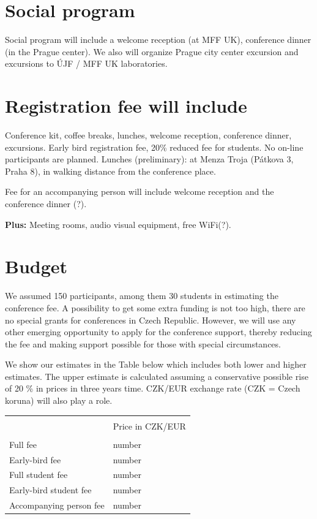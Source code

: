 \documentclass[12pt]{extarticle}
\begin{document}
\section*{Social program}
\noindent
Social program will include a welcome reception (at MFF UK), conference dinner (in the Prague center). 
We also will organize Prague city center excursion and excursions to ÚJF / MFF UK laboratories.

\section*{Registration fee will include}
\noindent
Conference kit, coffee breaks, lunches, welcome reception, conference dinner, excursions. Early bird registration fee, 20\%
reduced fee for students. No on-line participants are planned.
Lunches (preliminary): at Menza Troja (Pátkova 3, Praha 8), in walking distance from the conference place.

Fee for an accompanying person will include welcome reception and the conference dinner (?).

{\bf Plus:} Meeting rooms,  audio visual equipment,  free WiFi(?).


\section*{Budget}
\noindent
We assumed 150 participants, among them 30 students in estimating the conference fee.
A possibility to  get some extra funding is not too high, there are no special grants for conferences
in Czech Republic. However, we will use any other emerging opportunity to apply for the conference
support, thereby reducing the fee and making support possible for those with special circumstances.

We show our estimates in the Table below which includes both lower and higher estimates. The upper
estimate is calculated assuming a conservative possible rise of 20 \% in prices in three years time.  
CZK/EUR exchange rate (CZK = Czech koruna) will also play a role.

\begin{table}[h]
\centering
\begin{tabular}{ll}
\hline \\[-1mm]
 &   Price in CZK/EUR  \\[1mm]
\hline \\[-1mm]
 Full fee &  number \\[1mm]
 Early-bird fee & number  \\[1mm]
 Full student fee &  number \\[1mm]
 Early-bird student fee & number  \\[1mm]
 Accompanying person fee & number  \\[1mm]
\hline
\end{tabular}
\end{table}
\end{document}
